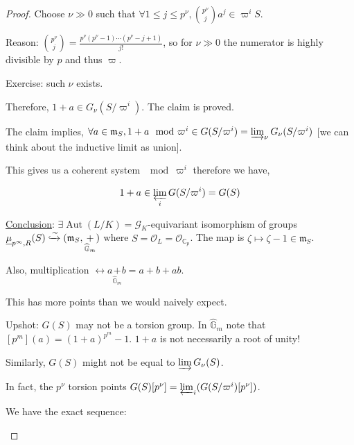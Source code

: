 \documentclass{article}
\theoremstyle{definition}
\numberwithin{theorem}{subsection}
\begin{document}
    \begin{proof}
        Choose \(\nu \gg 0\) such that \(\forall 1 \leq j \leq p^\nu, \binom{p^{\nu}}{j} a^j \in \varpi^i S\).
        
        Reason: \(\binom{p^\nu}{j} = \frac{p^\nu(p^\nu - 1) \cdots (p^\nu - j + 1)}{j!}\), so for \(\nu \gg 0\) the numerator is highly divisible by \(p\) and thus \(\varpi\).
        
        Exercise: such \(\nu\) exists.

        Therefore, \(1+a\in G_\nu(S / \varpi^i)\). The claim is proved.

        The claim implies, \(\forall a\in \mathfrak{m}_S, 1+a \mod \varpi^i \in G(S / \varpi^i) = \varinjlim_\nu G_\nu (S / \varpi^i)\) [we can think about the inductive limit as union].  

        This gives us a coherent system \(\mod \varpi^i\) therefore we have,

        \[
            1 + a\in \varprojlim_i G(S / \varpi^i) = G(S)
        \]

        \underline{Conclusion}: \(\exists \operatorname{Aut}(L / K) = \mathscr{G}_K\)-equivariant isomorphism of groups \(\underline{\mu}_{p^{\infty}, R}(S) \xhookrightarrow{\sim} (\mathfrak{m}_S, \underset{\widehat{\mathbb{G}}_m}{+})\) where \(S = \mathcal{O}_L = \mathcal{O}_{\mathbb{C}_p}\). The map is \(\zeta \mapsto \zeta - 1 \in \mathfrak{m}_S\).
        
        Also, multiplication \(\leftrightarrow a\underset{\widehat{\mathbb{G}}_m}{+} b = a+b+ab\).
        
        This has more points than we would naively expect.

        Upshot: \(G(S)\) may not be a torsion group. In \(\widehat{\mathbb{G}}_m\) note that \([p^m](a) = (1+a)^{p^m} - 1\). \(1+a\) is not necessarily a root of unity!
        
        Similarly, \(G(S)\) might not be equal to \(\varinjlim G_\nu(S)\).

        In fact, the \(p^\nu\) torsion points \(G(S)[p^\nu] = \varprojlim_i (G(S / \varpi^i)[p^\nu])\).
        
        We have the exact sequence:

        \begin{center}
        \end{center}


\end{proof}
\end{document}
